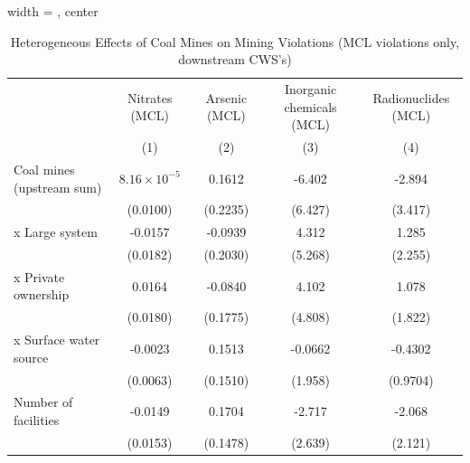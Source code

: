 
\begin{table}[htbp]
   
   \caption{\label{tab:2sls_het_unified_minevio_ivsum_mcl} Heterogeneous Effects of Coal Mines on Mining Violations (MCL violations only, downstream CWS's)}
   \bigskip
   
   \centering
   
   \begin{adjustbox}{width = \textwidth, center}
      
      
      \begin{tabular}{lcccc}
         \toprule
         
                                                       & Nitrates (MCL)        & Arsenic (MCL)         & Inorganic chemicals (MCL) & Radionuclides (MCL)\\  
         
                                                       & (1)                   & (2)                   & (3)                       & (4)\\  
         
         \midrule 
         Coal mines (upstream sum)                     & $8.16\times 10^{-5}$  & 0.1612                & -6.402                    & -2.894\\   
                                                       & (0.0100)              & (0.2235)              & (6.427)                   & (3.417)\\   
           x Large system                              & -0.0157               & -0.0939               & 4.312                     & 1.285\\   
                                                       & (0.0182)              & (0.2030)              & (5.268)                   & (2.255)\\   
           x Private ownership                         & 0.0164                & -0.0840               & 4.102                     & 1.078\\   
                                                       & (0.0180)              & (0.1775)              & (4.808)                   & (1.822)\\   
           x Surface water source                      & -0.0023               & 0.1513                & -0.0662                   & -0.4302\\   
                                                       & (0.0063)              & (0.1510)              & (1.958)                   & (0.9704)\\   
         Number of facilities                          & -0.0149               & 0.1704                & -2.717                    & -2.068\\   
                                                       & (0.0153)              & (0.1478)              & (2.639)                   & (2.121)\\   
         

\end{tabular}
\end{adjustbox}
\end{table}
